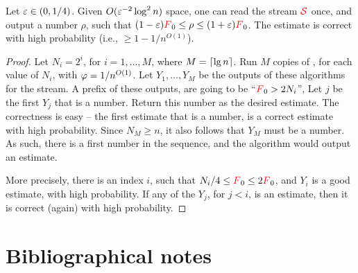 \begin{lemma}
    Let ${\varepsilon} \in (0,1/4)$.  Given $O({\varepsilon}^{-2} \log^2 n)$ space, one
    can read the stream ${\textcolor{red}{\mathcal{S}}}$ once, and output a number $\rho$, such
    that $(1-{\varepsilon}){\textcolor{red}{F}}_0 \leq \rho \leq (1+{\varepsilon}){\textcolor{red}{F}}_0$. The estimate
    is correct with high probability (i.e., $\geq 1-1/n^{O(1)}$).
\end{lemma}
\begin{proof}
    Let $N_i = 2^i$, for $i=1, \ldots, M$, where $M = \left\lceil {\lg n} \right\rceil$. Run $M$
    copies of , for each value of $N_i$, with
    $\varphi = 1/n^{O(1)}$. Let $Y_1, \ldots, Y_M$ be the outputs of
    these algorithms for the stream. A prefix of these outputs, are
    going to be ``${\textcolor{red}{F}}_0 > 2N_i$'', Let $j$ be the first $Y_j$ that
    is a number. Return this number as the desired estimate. The
    correctness is easy -- the first estimate that is a number, is a
    correct estimate with high probability. Since $N_M \geq n$, it
    also follows that $Y_M$ must be a number. As such, there is a
    first number in the sequence, and the algorithm would output an
    estimate.

    More precisely, there is an index $i$, such that
    $N_i/4 \leq {\textcolor{red}{F}}_0 \leq 2{\textcolor{red}{F}}_0$, and $Y_i$ is a good estimate,
    with high probability. If any of the $Y_j$, for $j < i$, is an
    estimate, then it is correct (again) with high probability.
\end{proof}



\section{Bibliographical notes}






